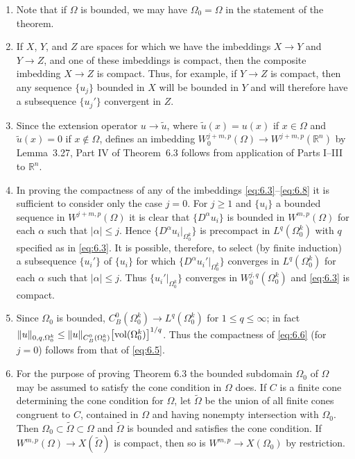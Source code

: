 \begin{remarks}
  \begin{enumerate}[1.]
    \item Note that if $\Omega$ is bounded, we may have $\Omega_0 = \Omega$ in the statement of the theorem.
    \item If $X$, $Y$, and $Z$ are spaces for which we have the imbeddings $X\to Y$ and $Y\to Z$,
      and one of these imbeddings is compact, then the composite imbedding $X\to Z$ is compact.
      Thus, for example, if $Y\to Z$ is compact, then any sequence $\{u_j\}$ bounded in $X$ will
      be bounded in $Y$ and will therefore have a subsequence $\{u_j'\}$ convergent in $Z$.
    \item Since the extension operator $u\to\tilde{u}$, where $\tilde{u}(x) = u(x)$ if $x\in\Omega$
      and $\tilde{u}(x) = 0$ if $x\notin \Omega$,
      defines an imbedding $W_0^{j+m,p}(\Omega) \to W^{j+m,p}(\mathbb{R}^n)$ by Lemma~3.27, Part IV of Theorem~6.3
      follows from application of Parts I--III to $\mathbb{R}^n$.
    \item In proving the compactness of any of the imbeddings \eqref{eq:6.3}--\eqref{eq:6.8} it is
      sufficient to consider only the case $j=0$. For $j\geq 1$ and $\{u_i\}$ a bounded sequence in
      $W^{j+m,p}(\Omega)$ it is clear that $\{D^\alpha u_i\}$ is bounded in $W^{m,p}(\Omega)$ for each $\alpha$
      such that $|\alpha|\leq j$. Hence $\{D^\alpha u_i|_{\Omega_0^k}\}$ is precompact in $L^q(\Omega_0^k)$
      with $q$ specified as in \eqref{eq:6.3}. It is possible, therefore, to select (by finite induction)
      a subsequence $\{u_i'\}$ of $\{u_i\}$ for which $\{D^\alpha u_i'|_{\Omega_0^k}\}$
      converges in $L^q(\Omega_0^k)$ for each $\alpha$ such that $|\alpha|\leq j$.
      Thus $\{u_i'|_{\Omega_0^k}\}$ converges in $W_0^{j,q}(\Omega_0^k)$ and \eqref{eq:6.3} is compact.
    \item Since $\Omega_0$ is bounded, $C_B^0(\Omega_0^k)\to L^q(\Omega_0^k)$ for $1\leq q\leq \infty$;
      in fact $\|u\|_{0,q,\Omega_0^k} \leq \|u\|_{C_B^0(\Omega_0^k)} \bigl[\operatorname{vol} (\Omega_0^k)\bigr]^{1/q}$.
      Thus the compactness of \eqref{eq:6.6} (for $j=0$) follows from that of \eqref{eq:6.5}.
    \item For the purpose of proving Theorem 6.3 the bounded subdomain $\Omega_0$ of $\Omega$ may be assumed
      to satisfy the cone condition in $\Omega$ does. If $C$ is a finite cone determining the cone condition
      for $\Omega$, let $\widetilde{\Omega}$ be the union of all finite cones congruent to $C$, contained in
      $\Omega$ and having nonempty intersection with $\Omega_0$.
      Then $\Omega_0\subset\widetilde{\Omega}\subset\Omega$ and $\widetilde{\Omega}$ is bounded and satisfies
      the cone condition. If $W^{m,p}(\Omega)\to X(\widetilde{\Omega})$ is compact, then so is
      $W^{m,p}\to X(\Omega_0)$ by restriction.
  \end{enumerate}
\end{remarks}

